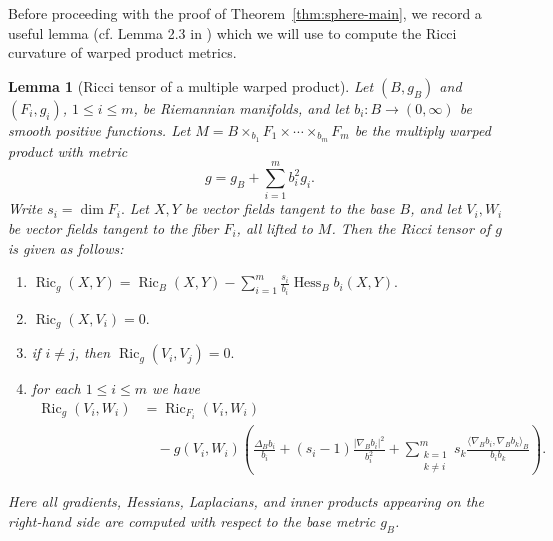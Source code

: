 \documentclass[11pt,reqno]{amsart}
\numberwithin{equation}{section}
\newtheorem{lem}[thm]{Lemma}
\theoremstyle{definition}
\theoremstyle{remark}
\newcommand{\0}{\emptyset}
\begin{document}
Before proceeding with the proof of Theorem~\ref{thm:sphere-main}, we record a
useful lemma (cf. Lemma 2.3 in \cite{karaca2018gradient}) which we will use to
compute the Ricci curvature of warped product metrics.
\begin{lem}[Ricci tensor of a multiple warped product]\label{lem:multiply-warped-ricci}
Let \((B,g_B)\) and \((F_i,g_i)\), \(1\leq i\leq m\), be Riemannian
manifolds, and let $b_i:B\to (0,\infty)$ be smooth positive functions. Let $M=B\times_{b_1}F_1\times\cdots\times_{b_m}F_m$ be the multiply warped product with metric
\[
        g
        =
        g_B+\sum_{i=1}^m b_i^2 g_i.
\]
Write $s_i=\dim F_i.$ Let \(X,Y\) be vector fields tangent to the base \(B\), and let \(V_i,W_i\)
be vector fields tangent to the fiber \(F_i\), all lifted to \(M\). Then the
Ricci tensor of \(g\) is given as follows:
\begin{enumerate}
    \item $\operatorname{Ric}_g(X,Y)
        =
        \operatorname{Ric}_B(X,Y)
        -
        \sum_{i=1}^m
        \frac{s_i}{b_i}\operatorname{Hess}_B b_i(X,Y).$
    \item $\operatorname{Ric}_g(X,V_i)=0.$
    \item if
\(i\neq j\), then
$\operatorname{Ric}_g(V_i,V_j)=0.$
    \item for each $1\leq i\leq m$ we have
    \begin{align}
      \operatorname{Ric}_g(V_i,W_i)
        &=
        \operatorname{Ric}_{F_i}(V_i,W_i)
        \\
        &\quad
        -
        g(V_i,W_i)
        \left(
        \frac{\Delta_B b_i}{b_i}
        +
        (s_i-1)\frac{|\nabla_B b_i|^2}{b_i^2}
        +
        \sum_{\substack{k=1\\ k\neq i}}^m
        s_k
        \frac{\langle\nabla_B b_i,\nabla_B b_k\rangle_B}{b_i b_k}
        \right).  
    \end{align}
    
\end{enumerate}
Here all gradients, Hessians, Laplacians, and inner products appearing on
the right-hand side are computed with respect to the base metric \(g_B\).
\end{lem}
\end{document}
